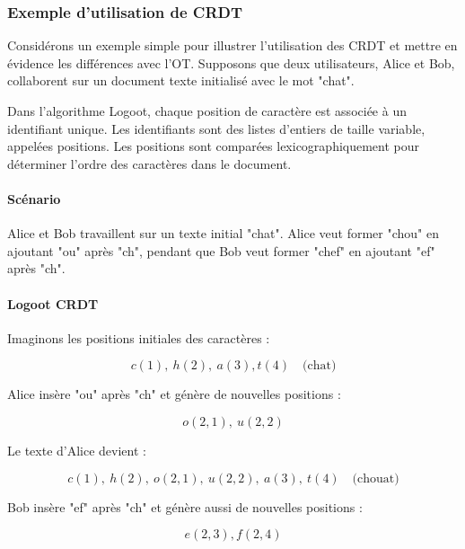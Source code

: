 \subsubsection{Exemple d'utilisation de CRDT}
Considérons un exemple simple pour illustrer l'utilisation des CRDT et mettre en évidence les différences avec l'OT. Supposons que deux utilisateurs, Alice et Bob, collaborent sur un document texte initialisé avec le mot "chat".

Dans l'algorithme Logoot, chaque position de caractère est associée à un identifiant unique. Les identifiants sont des listes d'entiers de taille variable, appelées positions. Les positions sont comparées lexicographiquement pour déterminer l'ordre des caractères dans le document.

\paragraph{Scénario}

Alice et Bob travaillent sur un texte initial "chat". Alice veut former "chou" en ajoutant "ou" après "ch", pendant que Bob veut former "chef" en ajoutant "ef" après "ch".

\paragraph{Logoot CRDT}

Imaginons les positions initiales des caractères :

\begin{equation}
c(1),\ h(2), \ a(3), t(4) \quad \text{(chat)}
\end{equation}

Alice insère "ou" après "ch" et génère de nouvelles positions :

\begin{equation}
o(2, 1), \ u(2, 2)
\end{equation}

Le texte d'Alice devient :

\begin{equation}
c(1), \ h(2), \ o(2, 1), \ u(2, 2), \ a(3), \ t(4) \quad \text{(chouat)}
\end{equation}

Bob insère "ef" après "ch" et génère aussi de nouvelles positions :

\begin{equation}
e(2, 3), f(2, 4)
\end{equation}

